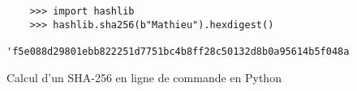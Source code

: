 \begin{figure}
  \begin{verbatim}
    >>> import hashlib
    >>> hashlib.sha256(b"Mathieu").hexdigest()
    'f5e088d29801ebb822251d7751bc4b8ff28c50132d8b0a95614b5f048a1d01b6'
  \end{verbatim}

  \caption{Calcul d'un SHA-256 en ligne de commande en Python}
  \label{code:sha256-hash-cli}
\end{figure}
